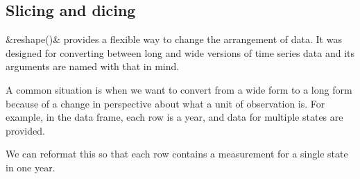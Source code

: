 \subsection{Slicing and dicing}


&reshape()& provides a flexible way to change the arrangement of data.  
%
It was designed for converting between long and wide versions of 
time series data and its arguments are named with that in mind.

A common situation is when we want to convert from a wide form to a 
long form because of a change in perspective about what a unit of 
observation is.  For example, in the  data frame, each 
row is a year, and data for multiple states are provided.

\begin{knitrout}
\end{knitrout}

We can reformat this so that each row contains a measurement for a 
single state in one year.

